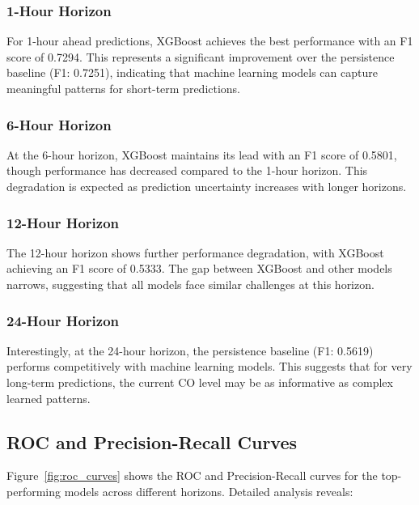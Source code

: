 \documentclass[12pt,a4paper]{article}
\begin{document}
\subsubsection{1-Hour Horizon}
For 1-hour ahead predictions, XGBoost achieves the best performance with an F1 score of 0.7294. This represents a significant improvement over the persistence baseline (F1: 0.7251), indicating that machine learning models can capture meaningful patterns for short-term predictions.

\subsubsection{6-Hour Horizon}
At the 6-hour horizon, XGBoost maintains its lead with an F1 score of 0.5801, though performance has decreased compared to the 1-hour horizon. This degradation is expected as prediction uncertainty increases with longer horizons.

\subsubsection{12-Hour Horizon}
The 12-hour horizon shows further performance degradation, with XGBoost achieving an F1 score of 0.5333. The gap between XGBoost and other models narrows, suggesting that all models face similar challenges at this horizon.

\subsubsection{24-Hour Horizon}
Interestingly, at the 24-hour horizon, the persistence baseline (F1: 0.5619) performs competitively with machine learning models. This suggests that for very long-term predictions, the current CO level may be as informative as complex learned patterns.

\subsection{ROC and Precision-Recall Curves}

Figure~\ref{fig:roc_curves} shows the ROC and Precision-Recall curves for the top-performing models across different horizons. Detailed analysis reveals:
\end{document}
